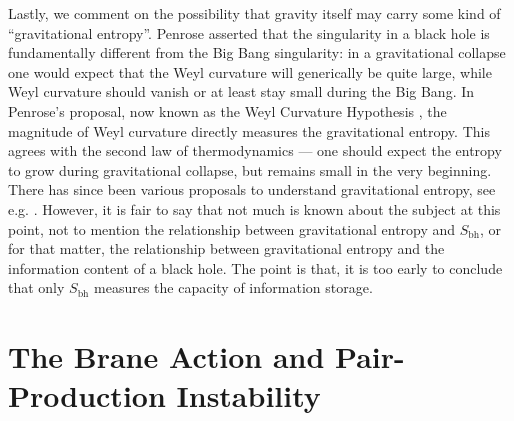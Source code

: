 \documentclass[12pt]{article}
\newcommand{\2}{$^2$}
\newcommand{\3}{$^3$}
\newcommand{\4}{$_4$}
\newcommand{\5}{$_5$}
\begin{document}
Lastly, we comment on the possibility that gravity itself may carry some kind of ``gravitational entropy''. Penrose asserted that the singularity in a black hole is fundamentally different from the Big Bang singularity: in a gravitational collapse one would expect that the Weyl curvature will generically be quite large, while Weyl curvature should vanish or at least stay small during the Big Bang. In Penrose's proposal, now known as the Weyl Curvature Hypothesis \cite{WCH}, the magnitude of Weyl curvature directly measures the gravitational entropy. This agrees with the second law of thermodynamics --- one should expect the entropy to grow during gravitational collapse, but remains small in the very beginning. There has since been various proposals to understand gravitational entropy, see e.g. \cite{1411.5708,0711.1656}. However, it is fair to say that not much is known about the subject at this point, not to mention the relationship between gravitational entropy and $S_{\text{bh}}$, or for that matter, the relationship between gravitational entropy and the information content of a black hole. The point is that, it is too early to conclude that only $S_{\text{bh}}$ measures the capacity of information storage.


 
\section{The Brane Action and Pair-Production Instability}\label{B}
\end{document}
